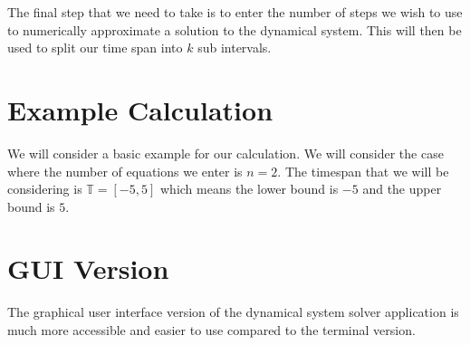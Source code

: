 \documentclass[12pt]{report}
\begin{document}
The final step that we need to take is to enter the number of steps we wish to use to numerically approximate a solution to the dynamical system. This will then be used to split our time span into $k$ sub intervals. 
\section*{Example Calculation}
We will consider a basic example for our calculation. We will consider the case where the number of equations we enter is $n = 2$. The timespan that we will be considering is $\mathbb{T} = [-5,5]$ which means the lower bound is $-5$ and the upper bound is $5$.

\section*{GUI Version}
The graphical user interface version of the dynamical system solver application is much more accessible and easier to use compared to the terminal version.
\end{document}
